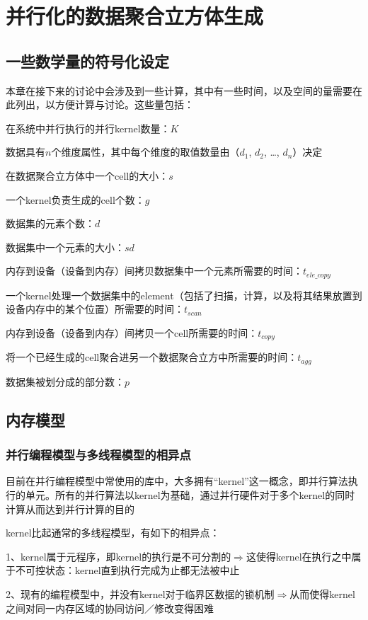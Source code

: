\chapter{并行化的数据聚合立方体生成}
\section{一些数学量的符号化设定}

本章在接下来的讨论中会涉及到一些计算，其中有一些时间，以及空间的量需要在此列出，以方便计算与讨论。这些量包括：

在系统中并行执行的并行kernel数量：$K$

数据具有$n$个维度属性，其中每个维度的取值数量由（$d_1$, $d_2$, …, $d_n$）决定

在数据聚合立方体中一个cell的大小：$s$

一个kernel负责生成的cell个数：$g$

数据集的元素个数：$d$

数据集中一个元素的大小：$sd$

内存到设备（设备到内存）间拷贝数据集中一个元素所需要的时间：$t_{ele\_copy}$

一个kernel处理一个数据集中的element（包括了扫描，计算，以及将其结果放置到设备内存中的某个位置）所需要的时间：$t_{scan}$

内存到设备（设备到内存）间拷贝一个cell所需要的时间：$t_{copy}$

将一个已经生成的cell聚合进另一个数据聚合立方中所需要的时间：$t_{agg}$

数据集被划分成的部分数：$p$

\section{内存模型}

\subsection{并行编程模型与多线程模型的相异点}
目前在并行编程模型中常使用的库中，大多拥有“kernel”这一概念，即并行算法执行的单元。所有的并行算法以kernel为基础，通过并行硬件对于多个kernel的同时计算从而达到并行计算的目的

kernel比起通常的多线程模型，有如下的相异点：

1、kernel属于元程序，即kernel的执行是不可分割的{\quad$\Rightarrow$\quad}这使得kernel在执行之中属于不可控状态：kernel直到执行完成为止都无法被中止

2、现有的编程模型中，并没有kernel对于临界区数据的锁机制{\quad$\Rightarrow$\quad}从而使得kernel之间对同一内存区域的协同访问／修改变得困难

